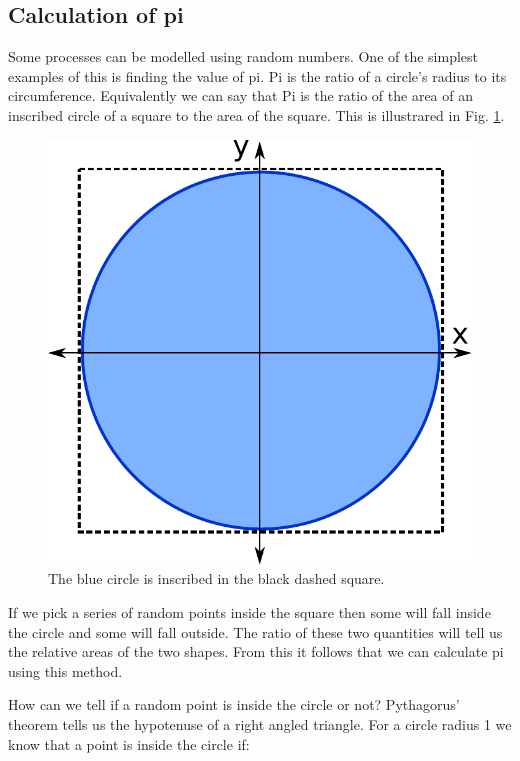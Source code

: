 	\subsection{Calculation of pi}
		Some processes can be modelled using random numbers. One of the simplest examples of this is finding the value of pi. Pi is the ratio of a circle's radius to its circumference. Equivalently we can say that Pi is the ratio of the area of an inscribed circle of a square to the area of the square. This is illustrared in Fig. \ref{fig:picircle}. 
	\begin{figure}[h]
		\centering
		\includegraphics[scale=0.4]{images/pi}
		\caption{The blue circle is inscribed in the black dashed square.}
		\label{fig:picircle}
	\end{figure}

	If we pick a series of random points inside the square then some will fall inside the circle and some will fall outside. The ratio of these two quantities will tell us the relative areas of the two shapes. From this it follows that we can calculate pi using this method.

	How can we tell if a random point is inside the circle or not? Pythagorus' theorem tells us the hypotenuse of a right angled triangle. For a circle radius 1 we know that a point is inside the circle if:

